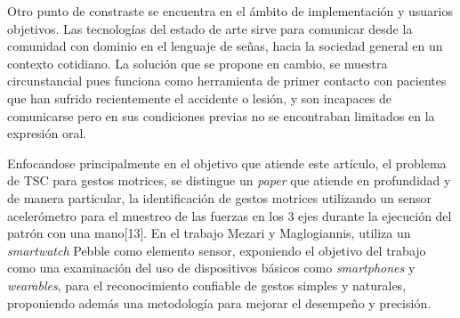 \hfill\break
\justifying
Otro punto de constraste se encuentra en el ámbito de implementación y usuarios objetivos. Las tecnologías del estado de arte sirve para comunicar desde la comunidad con dominio en el lenguaje de señas, hacia la sociedad general en un contexto cotidiano. La solución que se propone en cambio, se muestra circunstancial pues funciona como herramienta de primer contacto con pacientes que han sufrido recientemente el accidente o lesión, y son incapaces de comunicarse pero en sus condiciones previas no se encontraban limitados en la expresión oral.

\hfill\break
\justifying
Enfocandose principalmente en el objetivo que atiende este artículo, el problema de TSC para gestos motrices, se distingue un \textit{paper} que atiende en profundidad y de manera particular, la identificación de gestos motrices utilizando un sensor acelerómetro para el muestreo de las fuerzas en los 3 ejes durante la ejecución del patrón con una mano[13]. En el trabajo Mezari y Maglogiannis, utiliza un \textit{smartwatch} Pebble como elemento sensor, exponiendo el objetivo del trabajo como una examinación del uso de dispositivos básicos como \textit{smartphones} y \textit{wearables}, para el reconocimiento confiable de gestos simples y naturales, proponiendo además una metodología para mejorar el desempeño y precisión.